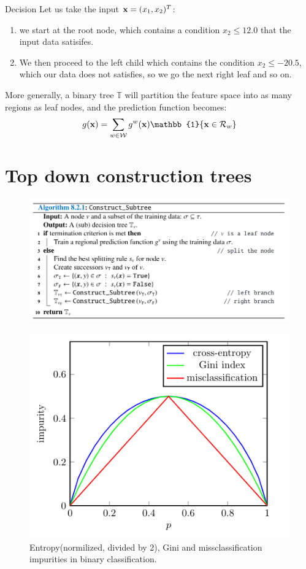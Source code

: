 \documentclass{beamer}
\begin{document}
\begin{frame}{Decision}
    Let us take the input $\textbf{x}=(x_1,x_2)^T$:
    \begin{enumerate}
        \item we start at the root node, which contains a condition $x_2\leq 12.0$ that the input data satisifes.
        \item We then proceed to the left child which contains the condition $x_2 \leq -20.5$, which our data does not satisfies, so we go the next right leaf and so on.
    \end{enumerate}
    More generally, a binary tree $\mathbb{T}$ will partition the feature space into as many regions as leaf nodes, and the prediction function becomes:
    \[
        g(\uvec{x})=\sum_{w\in\mathcal{W}}g^w (\uvec{x})\mathbb{1}\{\uvec{x}\in \mathcal{R}_w\}   
    \]
\end{frame}

\section{Top down construction trees}

\begin{frame}
    \begin{figure}
        \includegraphics[width=0.9\linewidth]{A821Kroese}
    \end{figure}
\end{frame}

\begin{frame}
    \begin{figure}
        \includegraphics[width=0.7\linewidth]{F83Kroese}
        \caption{Entropy(normilized, divided by 2), Gini and missclassification impurities in binary classification.\cite{kroese2020}}
    \end{figure}
\end{frame}
\end{document}
